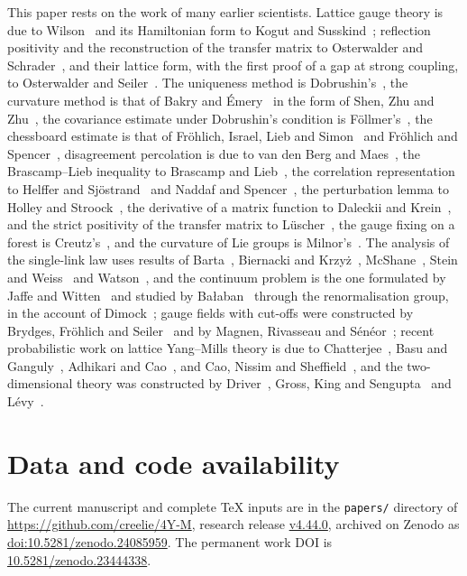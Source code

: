\documentclass[aps,prd,twocolumn,superscriptaddress,nofootinbib,longbibliography,floatfix,amsmath,amssymb,10pt]{revtex4-2}
\theoremstyle{definition}
\theoremstyle{remark}
\begin{document}
This paper rests on the work of many earlier scientists. Lattice gauge
theory is due to Wilson~\cite{Wil74} and its Hamiltonian form to Kogut and
Susskind~\cite{KS75}; reflection positivity and the reconstruction of the
transfer matrix to Osterwalder and Schrader~\cite{OS73,OS75}, and their
lattice form, with the first proof of a gap at strong coupling, to
Osterwalder and Seiler~\cite{OSei78,Sei82}. The uniqueness method is
Dobrushin's~\cite{Dob68,Dob70,DS85}, the curvature method is that of Bakry
and \'Emery~\cite{BE85,BGL14} in the form of Shen, Zhu and Zhu~\cite{SZZ23},
the covariance estimate under Dobrushin's condition is F\"ollmer's~\cite{Fol82},
the chessboard estimate is that of Fr\"ohlich, Israel, Lieb and
Simon~\cite{FILS78} and Fr\"ohlich and Spencer~\cite{FS82}, disagreement
percolation is due to van den Berg and Maes~\cite{vdBM94}, the
Brascamp--Lieb inequality to Brascamp and Lieb~\cite{BL76}, the
correlation representation to Helffer and Sj\"ostrand~\cite{HS94} and
Naddaf and Spencer~\cite{NS97}, the perturbation lemma to Holley and
Stroock~\cite{HS87}, the derivative of a matrix function to Daleckii and
Krein~\cite{DK65}, and the strict positivity of the transfer matrix to
L\"uscher~\cite{Lus77},
the gauge fixing on a forest is Creutz's~\cite{Cre77}, and the curvature of
Lie groups is Milnor's~\cite{Mil76}. The analysis of the single-link law
uses results of Barta~\cite{Bar37}, Biernacki and Krzy\.z~\cite{BK55},
McShane~\cite{McS34}, Stein and Weiss~\cite{SW71} and Watson~\cite{Wat44}, and
the continuum problem is the one formulated by Jaffe and Witten~\cite{JW06}
and studied by Ba{\l}aban~\cite{Bal84a,Bal85a,Bal89b} through the
renormalisation group, in the account of Dimock~\cite{Dim13}; gauge fields
with cut-offs were constructed by Brydges, Fr\"ohlich and
Seiler~\cite{BFS79} and by Magnen, Rivasseau and S\'en\'eor~\cite{MRS93};
recent probabilistic work on lattice Yang--Mills
theory is due to Chatterjee~\cite{Chat19,Chat19b}, Basu and
Ganguly~\cite{BG18}, Adhikari and Cao~\cite{AC25}, and Cao, Nissim and
Sheffield~\cite{CNS25}, and the two-dimensional theory was constructed by
Driver~\cite{Dri89}, Gross, King and Sengupta~\cite{GKS89} and
L\'evy~\cite{Lev03}.

\section*{Data and code availability}

\par The current manuscript and complete TeX inputs are in the \texttt{papers/} directory of \url{https://github.com/creelie/4Y-M}, research release \href{https://github.com/creelie/4Y-M/releases/tag/v4.44.0}{v4.44.0}, archived on Zenodo as \href{https://doi.org/10.5281/zenodo.24085959}{doi:10.5281/zenodo.24085959}. The permanent work DOI is \href{https://doi.org/10.5281/zenodo.23444338}{10.5281/zenodo.23444338}.
\end{document}
